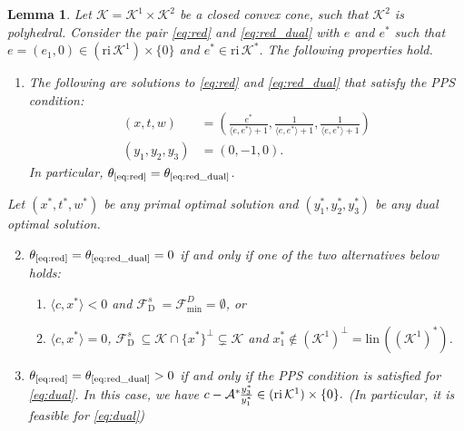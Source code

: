 \documentclass{article}
\newcommand{\reInt}{\mathrm{ri}\,}
\newcommand{\lineality}{\mathrm{lin}\,}
\newcommand{\inProd}[2]{\langle #1 , #2 \rangle }
\newcommand{\feasS}{\mathcal{F}_{\text{D }}^s}
\newcommand{\minFaceD}{ {\mathcal{F}_{\min}^D}}
\newcommand{\stdMap}{ {\mathcal{A}}}
\newcommand{\stdCone}{ {\mathcal{K}}}
\newcommand{\stdInt}{ {e}}
\newcommand{\opt}[1]{ {\theta _{#1}}}
\newcommand{\PPS}{{PPS}}
\newcommand{\T}{\ast\hspace{-1pt}}
\newtheorem{lemma}[definition]{Lemma}
\begin{document}
\begin{lemma}\label{lemma:red2}
Let $\stdCone = \stdCone ^1 \times \stdCone ^2$ be a 
closed convex cone, such that $\stdCone ^2$ is polyhedral.
Consider the pair \eqref{eq:red} and \eqref{eq:red_dual} with 
$\stdInt$ and $\stdInt^*$ such that  $\stdInt = (\stdInt_1,0) \in (\reInt \stdCone ^1)\times \{0\}$ and 
$\stdInt^* \in \reInt \stdCone^*$.  The following properties hold.
\begin{enumerate}[label=(\roman*)]
\item The following are solutions to \eqref{eq:red} and \eqref{eq:red_dual} that satisfy the {\PPS} condition: 
\begin{align*}
(x,t,w)& = \left(\frac{\stdInt^*}{\inProd{\stdInt}{\stdInt^*}+1},\frac{1}{\inProd{\stdInt}{\stdInt^*}+1}, \frac{1}{\inProd{\stdInt}{\stdInt^*}+1}\right) \\
 (y_1,y_2,y_3) & = (0,-1,0).
 \end{align*} 
In particular, 
$\opt{\text{\ref{eq:red}}} =  \opt{\text{\ref{eq:red_dual}}}$.
\end{enumerate}
Let $(x^*,t^*,w^*)$ be any primal optimal solution and 
$(y_1^*,y_2^*,y_3^*)$ be any dual optimal solution.
 \begin{enumerate}[label=(\roman*)]
 \setcounter{enumi}{1} 
\item $\opt{\text{\ref{eq:red}}} =  \opt{\text{\ref{eq:red_dual}}} = 0$ if and only if 
one of the two alternatives below holds:
\begin{enumerate}
\item $\inProd{c}{x^*} < 0 $ and $\feasS = \minFaceD = \emptyset$, or
\item $\inProd{c}{x^*} = 0 $, $\feasS \subseteq  \stdCone \cap \{x^*\}^\perp \subsetneq \stdCone$ and 
$x^*_1 \not \in (\stdCone^1)^\perp = \lineality( (\stdCone^1 )^*)$.
\end{enumerate}

\item $\opt{\text{\ref{eq:red}}} =  \opt{\text{\ref{eq:red_dual}}} >  0$ if and only if the {\PPS} condition is satisfied for \eqref{eq:dual}. In this case, we have
$
c  -\stdMap^\T \frac{y_3^*}{y_1^*} \in (\reInt \stdCone ^1)\times \{0\}. 
$ (In particular, it is feasible for \eqref{eq:dual})

\end{enumerate}
\end{lemma}
\end{document}
